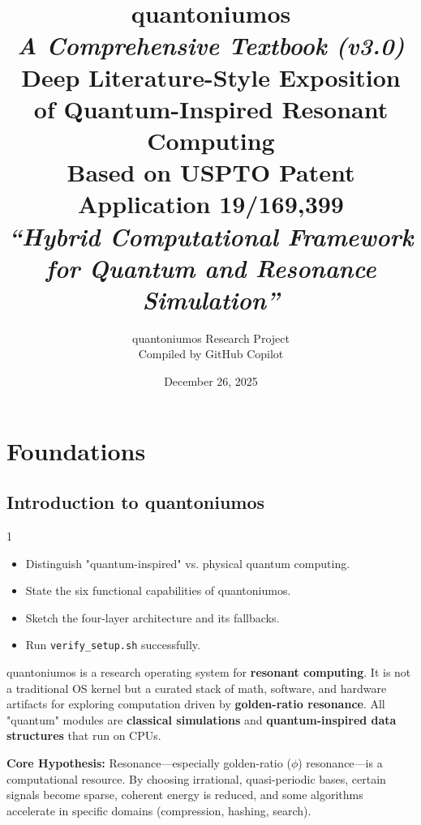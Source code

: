 \documentclass[11pt, a4paper, openany]{book}
\title{
    \vspace{-1.5cm}
    \Huge\textbf{quantoniumos}\\[0.35cm]
    \LARGE\textit{A Comprehensive Textbook (v3.0)}\\[0.7cm]
    \Large Deep Literature-Style Exposition of Quantum-Inspired Resonant Computing\\[1.2cm]
    \large Based on USPTO Patent Application 19/169,399\\
    \textit{``Hybrid Computational Framework for Quantum and Resonance Simulation''}
}
\author{quantoniumos Research Project \\ Compiled by GitHub Copilot}
\date{December 26, 2025}
\theoremstyle{definition}
\begin{document}
\maketitle
\tableofcontents

\part{Foundations}

\chapter{Introduction to quantoniumos}

\begin{todobox}{1}
\begin{itemize}
    \item[$\square$] Distinguish "quantum-inspired" vs. physical quantum computing.
    \item[$\square$] State the six functional capabilities of quantoniumos.
    \item[$\square$] Sketch the four-layer architecture and its fallbacks.
    \item[$\square$] Run \texttt{verify\_setup.sh} successfully.
\end{itemize}
\end{todobox}

quantoniumos is a research operating system for \textbf{resonant computing}. It is not a traditional OS kernel but a curated stack of math, software, and hardware artifacts for exploring computation driven by \textbf{golden-ratio resonance}. All "quantum" modules are \textbf{classical simulations} and \textbf{quantum-inspired data structures} that run on CPUs.

\begin{keyconceptbox}
\textbf{Core Hypothesis:} Resonance---especially golden-ratio ($\phi$) resonance---is a computational resource. By choosing irrational, quasi-periodic bases, certain signals become sparse, coherent energy is reduced, and some algorithms accelerate in specific domains (compression, hashing, search).
\end{keyconceptbox}
\end{document}
